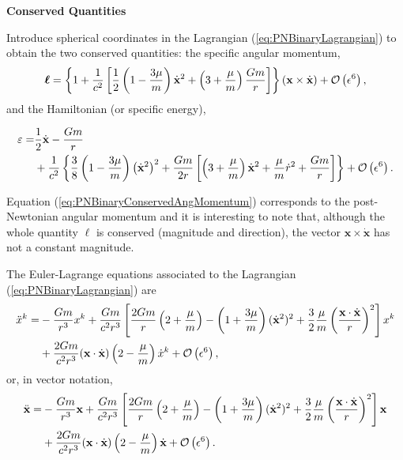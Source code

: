 \begin{exercise}
\textbf{Conserved Quantities}

Introduce spherical coordinates in the Lagrangian (\ref{eq:PNBinaryLagrangian}) to obtain the two conserved quantities: the specific angular momentum,
\begin{equation}
\boldsymbol{\ell} = \left\lbrace 1 + \frac{1}{c^2} \left[ \frac{1}{2} \left(1-\frac{3\mu}{m} \right) \dot{\textbf{x}} ^2 + \left( 3 + \frac{\mu}{m} \right) \frac{Gm}{r} \right] \right\rbrace \left( \textbf{x} \times \dot{\textbf{x}}\right) + {\mathcal{O}} \left( \epsilon^6 \right), \label{eq:PNBinaryConservedAngMomentum}
\end{equation}
and the Hamiltonian (or specific energy),
\begin{footnotesize}
\begin{align}
\varepsilon = &\frac{1}{2} \dot{\textbf{x}} - \frac{Gm}{r} \notag \\
& + \frac{1}{c^2} \left\lbrace \frac{3}{8} \left( 1- \frac{3\mu}{m} \right) \left( \dot{\textbf{x}} ^2 \right)^2 + \frac{Gm}{2r} \left[ \left( 3 + \frac{\mu}{m} \right) \dot{\textbf{x}}^2 + \frac{\mu}{m} \dot{r}^2 + \frac{Gm}{r} \right] \right\rbrace + {\mathcal{O}} \left( \epsilon^6 \right).   \label{eq:PNBinaryConservedEnergy}
\end{align}
\end{footnotesize}
\end{exercise}

Equation (\ref{eq:PNBinaryConservedAngMomentum}) corresponds to the  post-Newtonian angular momentum and it is interesting to note that, although the whole quantity $\boldsymbol{\ell}$ is conserved (magnitude and direction), the vector $\textbf{x} \times \dot{\textbf{x}}$ has not a constant magnitude.

The Euler-Lagrange equations associated to the Lagrangian (\ref{eq:PNBinaryLagrangian}) are
\begin{align}
\ddot{x} ^k = &-\frac{Gm}{r^3} x^k + \frac{Gm}{c^2 r^3} \left[  \frac{2Gm}{r} \left( 2 + \frac{\mu }{m} \right) - \left( 1 + \frac{3\mu }{m} \right) (\dot{\textbf{x}}^2)^2 + \frac{3}{2} \frac{\mu }{m} \left( \frac{\textbf{x} \cdot \dot{\textbf{x}}}{r} \right)^2   \right] x^k \notag \\
& + \frac{2Gm}{c^2 r^3} (\textbf{x} \cdot \dot{\textbf{x}}) \left( 2 - \frac{\mu }{m} \right) \dot{x}^k  + {\mathcal{O}} \left( \epsilon^6 \right), 
\end{align}
or, in vector notation, 
\begin{align}
\ddot{\textbf{x}} = &-\frac{Gm}{r^3} \textbf{x} + \frac{Gm}{c^2 r^3} \left[  \frac{2Gm}{r} \left( 2 + \frac{\mu }{m} \right) - \left( 1 + \frac{3\mu }{m} \right) (\dot{\textbf{x}}^2)^2 + \frac{3}{2} \frac{\mu }{m} \left( \frac{\textbf{x} \cdot \dot{\textbf{x}}}{r} \right)^2   \right] \textbf{x} \notag \\
& + \frac{2Gm}{c^2 r^3} (\textbf{x} \cdot \dot{\textbf{x}}) \left( 2 - \frac{\mu }{m} \right) \dot{\textbf{x}} + {\mathcal{O}} \left( \epsilon^6 \right). \label{eq:PNBinaryRelativeAcc}
\end{align}


